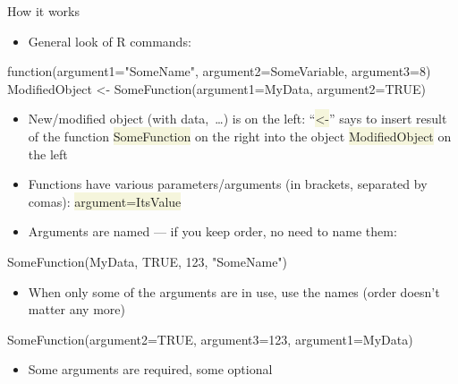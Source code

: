 \documentclass[compress, ucs, xelatex, 11pt, xcolor=svgnames, aspectratio=169,
	hyperref={
		bookmarks=true,
		unicode=true,
		colorlinks=true,
		pdftitle={Molecular data in R},
		plainpages=false,
		pdfauthor={Vojtech Zeisek},
		pdfsubject={Course about phylogeny and evolution in R},
		pdfcreator={XeLaTeX},
		pdfkeywords={R, evolution, phylogeny, molecular data},
		linkcolor=Crimson, %
		anchorcolor=Magenta, %
		citecolor=Magenta, %
		filecolor=Magenta, %
		menucolor=Magenta, %
		urlcolor=DodgerBlue, %
		pdftex},
	url={hyphens, lowtilde} %
	]{beamer}
\renewcommand{\texttt}[1]{\colorbox{Beige}{{\ttfamily #1}}}
\begin{document}
\begin{frame}[fragile]{How it works}
	\begin{itemize}
		\item General look of R commands:
	\end{itemize}
	\begin{spluscode}
    function(argument1="SomeName", argument2=SomeVariable, argument3=8)
    ModifiedObject <- SomeFunction(argument1=MyData, argument2=TRUE)
	\end{spluscode}
	\begin{itemize}
		\item New/modified object (with data,~\ldots) is on the left: \enquote{\texttt{<-}} says to insert result of the function \texttt{SomeFunction} on the right into the object \texttt{ModifiedObject} on the left
		\item Functions have various parameters/arguments (in brackets, separated by comas): \texttt{argument=ItsValue}
		\item Arguments are named --- if you keep order, no need to name them:
	\end{itemize}
	\begin{spluscode}
    SomeFunction(MyData, TRUE, 123, "SomeName")
	\end{spluscode}
	\begin{itemize}
		\item When only some of the arguments are in use, use the names (order doesn't matter any more)
	\end{itemize}
	\begin{spluscode}
    SomeFunction(argument2=TRUE, argument3=123, argument1=MyData)
	\end{spluscode}
	\begin{itemize}
		\item Some arguments are required, some optional
	\end{itemize}
\end{frame}
\end{document}
